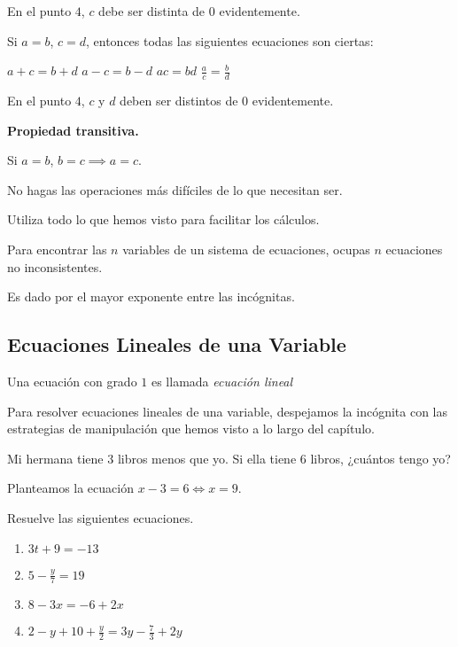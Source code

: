 En el punto $4$, $c$ debe ser distinta de $0$ evidentemente. 

Si $a=b$, $c=d$, entonces todas las 
siguientes ecuaciones son ciertas:

\begin{enumerate}
    \ii $a+c=b+d$
    \ii $a-c=b-d$
    \ii $ac = bd$
    \ii $\frac{a}{c} = \frac{b}{d}$
\end{enumerate}

En el punto $4$, $c$ y $d$ deben ser distintos de $0$ evidentemente.

\textbf{Propiedad transitiva.}

Si $a=b$, $b = c \implies a = c$. 

\begin{moral}
    No hagas las operaciones más difíciles de lo que necesitan 
    ser.
\end{moral}

Utiliza todo lo que hemos visto para facilitar los cálculos.

\begin{moral}
    Para encontrar las $n$ variables de un sistema de 
    ecuaciones, ocupas $n$ ecuaciones no inconsistentes. 
\end{moral}

\begin{definition}
    Es dado por el mayor exponente entre las incógnitas.
\end{definition}

\subsection{Ecuaciones Lineales de una Variable}

Una ecuación con grado $1$ es llamada \textit{ecuación lineal}

Para resolver ecuaciones lineales de una variable, 
despejamos la incógnita con las estrategias de manipulación 
que hemos visto a lo largo del capítulo.

\begin{example}
    Mi hermana tiene $3$ libros menos que yo. Si ella 
    tiene $6$ libros, ¿cuántos tengo yo?
\end{example}

\begin{soln}
    Planteamos la ecuación $x-3 = 6 \iff x = 9$.
\end{soln}

\begin{exercise}
    Resuelve las siguientes ecuaciones.
    \begin{enumerate}
        \item \( 3t + 9 = -13 \)
        \item \( 5 - \frac{y}{7} = 19 \)
        \item \( 8 - 3x = -6 + 2x \)
        \item \( 2 - y + 10 + \frac{y}{2} = 3y - \frac{7}{3} + 2y \)
    \end{enumerate}
\end{exercise}

